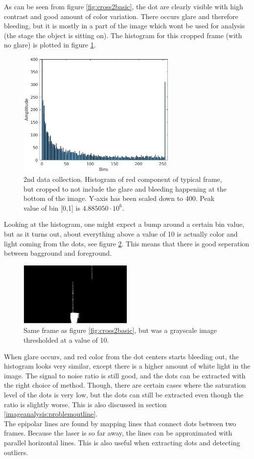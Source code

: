As can be seen from figure \ref{fig:cross2basic}, the dot are clearly visible with high contrast and good amount of color variation. There occurs glare and therefore bleeding, but it is mostly in a part of the image which wont be used for analysis (the stage the object is sitting on). The histogram for this cropped frame (with no glare) is plotted in figure \ref{fig:cross2basehistcropped}.
\FloatBarrier
\begin{figure}[h]
        \centering
        \includegraphics[width=0.7\textwidth]{figures/reconstruction/base2_cropped_histogram.eps}
        \caption{2nd data collection. Histogram of red component of typical frame, but cropped to not include the glare and bleeding happening at the bottom of the image. Y-axis has been scaled down to $400$. Peak value of bin [0,1] is $4.885050 \cdot 10^6$.}
        \label{fig:cross2basehistcropped}
\end{figure}
\FloatBarrier
Looking at the histogram, one might expect a bump around a certain bin value, but as it turns out, about everything above a value of 10 is actually color and light coming from the dots, see figure \ref{fig:base2_thresholded}. This means that there is good seperation between bagground and foreground. 
\begin{figure}[h]
    \centering
    \includegraphics[width=0.5\textwidth]{figures/reconstruction/base2_thresholded.eps}
    \caption{Same frame as figure \ref{fig:cross2basic}, but was a grayscale image thresholded at a value of 10. }
    \label{fig:base2_thresholded}
\end{figure}
When glare occurs, and red color from the dot centers starts bleeding out, the histogram looks very similar, except there is a higher amount of white light in the image. The signal to noise ratio is still good, and the dots can be extracted with the right choice of method. Though, there are certain cases where the saturation level of the dots is very low, but the dots can still be extracted even though the ratio is slightly worse. This is also discussed in section \ref{imageanalysis:problemoutline}. \\


The epipolar lines are found by mapping lines that connect dots between two frames. Because the laser is so far away, the lines can be approximated with parallel horizontal lines. This is also useful when extracting dots and detecting outliers. 

